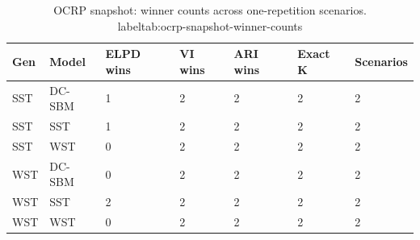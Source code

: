 \begin{table}[!h]
\centering
\caption{OCRP snapshot: winner counts across one-repetition scenarios.\\label{tab:ocrp-snapshot-winner-counts}}
\centering
\begin{tabular}[t]{lllllll}
\toprule
Gen & Model & ELPD wins & VI wins & ARI wins & Exact K & Scenarios\\
\midrule
SST & DC-SBM & 1 & 2 & 2 & 2 & 2\\
SST & SST & 1 & 2 & 2 & 2 & 2\\
SST & WST & 0 & 2 & 2 & 2 & 2\\
WST & DC-SBM & 0 & 2 & 2 & 2 & 2\\
WST & SST & 2 & 2 & 2 & 2 & 2\\
WST & WST & 0 & 2 & 2 & 2 & 2\\
\bottomrule
\end{tabular}
\end{table}

